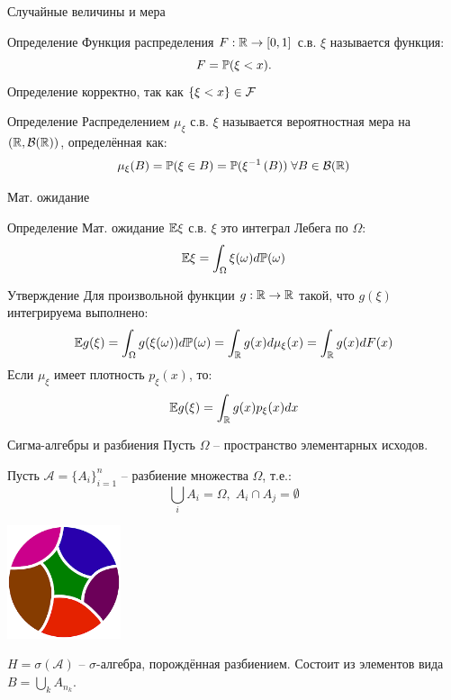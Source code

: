 \documentclass{beamer}
\begin{document}
\begin{frame}{Случайные величины и мера}
    \begin{block}{Определение}
        Функция распределения $F: \mathbb{R}\to[0, 1]$ с.в. $\xi$ называется функция:
        $$
            F = \mathbb{P}(\xi < x).
        $$Определение корректно, так как $\{\xi < x\} \in \mathcal{F}$
    \end{block}
    \begin{block}{Определение}
        Распределением $\mu_{\xi}$ с.в. $\xi$ называется вероятностная мера на $\left(\mathbb{R}, \mathcal{B}(\mathbb{R})\right)$, определённая как:
        $$
            \mu_{\xi}(B) = \mathbb{P}(\xi \in B) = \mathbb{P}(\xi^{-1}\left( B \right))\;\forall B\in\mathcal{B}(\mathbb{R})
        $$
    \end{block}
\end{frame}

\begin{frame}{Мат. ожидание} 
    \begin{block}{Определение}
    Мат. ожидание $\mathbb{E} \xi$ с.в. $\xi$ это интеграл Лебега по $\Omega$:
        $$
            \mathbb{E} \xi = \int_{\Omega}\xi(\omega)d\mathbb{P}(\omega)
        $$
    \end{block}
    \begin{block}{Утверждение}
        Для произвольной функции $g : \mathbb{R} \to \mathbb{R}$ такой, что $g(\xi)$ интегрируема выполнено:
        $$
            \mathbb{E} g(\xi) = \int_{\Omega} g(\xi(\omega))d\mathbb{P}(\omega)=\int_{\mathbb{R}} g(x) d\mu_{\xi}(x) = 
            \int_{\mathbb{R}} g(x) dF(x)
        $$
        Если $\mu_{\xi}$ имеет плотность $p_{\xi}(x)$, то:
        $$
            \mathbb{E} g(\xi) = \int_{\mathbb{R}} g(x) p_{\xi}(x) dx
        $$
    \end{block}
\end{frame}

\begin{frame}{Сигма-алгебры и разбиения}
    Пусть $\Omega$ -- пространство элементарных исходов.
    
    Пусть $\mathcal{A} = \{A_i\}_{i=1}^n$ -- разбиение множества $\Omega$, т.е.:
    $$\bigcup_i A_i = \Omega, \; A_i \cap A_j = \emptyset$$

    \begin{center}
        \includegraphics[width=0.25\textwidth]{8_figs/разбиение.png}
    \end{center}

    $H = \sigma(\mathcal{A})$ -- $\sigma$-алгебра, порождённая разбиением. Состоит из элементов вида 
    $B = \bigcup_{k} A_{n_k}$.
\end{frame}
\end{document}
